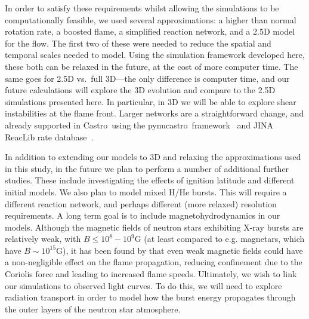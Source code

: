 \documentclass[preprint,times,tighten]{aastex63}
\newcommand{\castro}{{\sf Castro}}
\newcommand{\pynucastro}{{\sf pynucastro}}
\newcommand{\MarginPar}[1]{
    \marginpar{\vskip-\baselineskip%
               \raggedright%
               \tiny\sffamily%
               {\color{red}\hrule%
               \smallskip%
               #1\par%
               \smallskip%
               \hrule}}%
}
\begin{document}
In order to satisfy these requirements whilst allowing the simulations to be computationally feasible, we used several approximations: a higher than normal rotation rate, a boosted flame, a simplified reaction network, and a 2.5D model for the flow. The first two of these were needed to reduce the spatial and temporal scales needed to model. Using the simulation framework developed here, these both can be relaxed in the future, at the cost of more computer time. The same goes for 2.5D
vs.\ full 3D---the only difference is computer time, and our future
calculations will explore the 3D evolution and compare to the 2.5D simulations presented here. In particular,
in 3D we will be able to explore shear instabilities at the flame front.
Larger networks are a straightforward change, and already supported in
\castro\ using the \pynucastro\ framework~\citep{pynucastro} and JINA
ReacLib rate database~\citep{reaclib}. 

\MarginPar{Relate our work to previous work}

In addition to extending our models to 3D and relaxing the approximations used in this study, in the future we plan to perform a number of additional further studies. These include investigating the effects of ignition latitude and different initial models. We also plan to model mixed H/He bursts. This will require a
different reaction network, and perhaps different (more relaxed)
resolution requirements. A long term goal is to include magnetohydrodynamics in our models. Although the magnetic fields of neutron stars exhibiting X-ray bursts are relatively weak, with $B \leq 10^8 - 10^9$G \citep{mukherjee2015magnetic} (at least compared to e.g. magnetars, which have $B\sim 10^{15}$G), it has been found by \citet{art-2016-cavecchi-etal} that even weak magnetic fields could have a non-negligible effect on the flame propagation, reducing confinement due to the Coriolis force and leading to increased flame speeds. Ultimately, we wish to link our simulations to observed light curves. To do this, we will need to explore radiation transport in order to model how the burst energy propagates through the outer layers of the neutron star atmosphere. 




\end{document}
